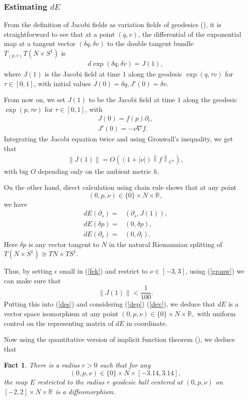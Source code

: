 \documentclass[11pt,a4paper]{amsart}
\numberwithin{equation}{section}
\newcommand{\de}{\delta}
\newcommand{\e}{\epsilon}
\newcommand{\no}[1]{\left\lVert#1\right\rVert}
\newcommand{\pd}{\partial}
\newcommand{\na}{\nabla}
\newcommand{\R}{\mathbb{R}}
\theoremstyle{plain}
\newtheorem{fact}[exam]{Fact}
\theoremstyle{definition}
\numberwithin{equation}{subsection}
\begin{document}
\subsubsection{Estimating $dE$}
From the definition of Jacobi fields as variation fields of geodesics (\cite[Chapter 10]{JLr}), it is straightforward to see that
at a point $(q,v)$, the differential of the exponential map at a tangent vector $(\de q,\de v)$ to the double tangent bundle $T_{(p,v)}T(N\times S^1)$ is \begin{align*}
d\exp(\de q,\de v)=J(1),
\end{align*}where $J(1)$ is the Jacobi field at time $1$ along the geodesic $\exp(q,\tau v)$ for $\tau\in[0,1]$, with initial values $J(0)=\de q,J'(0)=\de v.$

From now on, we set $J(1)$ to be the Jacobi field at time $1$ along the geodesic $\exp(p,\tau \nu)$ for $\tau\in[0,1]$, with 
\begin{align*}
	J(0)=f(p)\pd_t,\\J'(0)=-\nu\na f.
\end{align*}Integrating the Jacobi equation twice and using Gronwall's inequality, we get that 
\begin{align}\label{gronw}
	\no{J(1)}=O((1+|\nu|)\no{f}_{C^1}),
\end{align}with big $O$ depending only on the ambient metric $h.$
 
On the other hand, direct calculation using chain rule shows that at any point $$(0,p,\nu)\in\{0\}\times N\times \R,$$ we have %
\begin{align}
\label{des}dE(\pd_s)=&(\pd_s,J(1)),\\\label{dep}dE(\de p)=&(0,\de p),\\\label{dev}dE(\pd_\nu)=&(0,\pd_t).
\end{align}
Here $\de p $ is any vector tangent to $N$ in the natural  Riemannian splitting of $T(N\times S^1)\cong TN\times TS^1.$ 

Thus, by setting $\e$ small in (\ref{fek}) and restrict to $\nu\in[-3,3]$, using (\ref{gronw}) we can make sure that $$\no{J(1)}<\frac{1}{100}.$$ Putting this into (\ref{des}) and considering (\ref{dep}) (\ref{dev}), we deduce that $dE$ is a vector space isomorphism at any point $(0,p,\nu)\in\{0\}\times N\times \R,$ with uniform control on the representing matrix of $dE$ in coordinate.

Now using the quantitative version of implicit function theorem (\cite[Section 8]{MC}), we deduce that 
\begin{fact}\label{fctinv}
There is a radius $r>0$ such that for any $$(0,p,\nu)\in \{0\}\times N\times [-3.14,3.14],$$ the map $E$ restricted to the radius $r$ geodesic ball centered at $(0,p,\nu)$ on $[-2,2]\times N\times \R$ is a diffeomorphism.
\end{fact}
\end{document}
